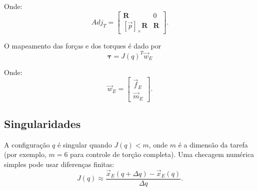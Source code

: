 Onde:
\begin{equation}
    \label{eq:jac_com_base2}
Adj_T =
\begin{bmatrix}
\mathbf{R} & 0\\
[\vec{p}]_\times \mathbf{R} & \mathbf{R}
\end{bmatrix}.
\end{equation}

%
O mapeamento das forças e dos torques é dado por
\begin{equation}
    \label{eq:forca_para_torque1}
\boldsymbol{\tau} = J(q)^{T} \vec{w}_{E}
\end{equation}

Onde:
\begin{equation}
    \label{eq:forca_para_torque2}
\vec{w}_{E} =
\begin{bmatrix}
\vec{f}_{E} \\
\vec{m}_{E}
\end{bmatrix}.
\end{equation}


\subsection{Singularidades}
A configuração $q$ é singular quando $J(q) < m$, onde $m$ é a dimensão da tarefa (por exemplo, $m=6$ para controle de torção completa). Uma checagem numérica simples pode usar diferenças finitas:
\begin{equation}
    \label{eq:jac_singularidadeCheck}
J(q) \approx
\frac{\vec{x}_E(q+\Delta q) - \vec{x}_E(q)}
{\Delta q}.
\end{equation}

